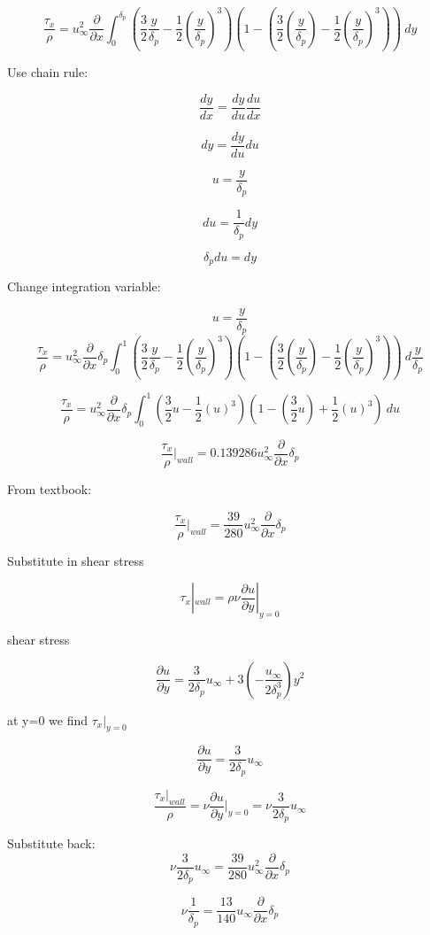 \documentclass[11pt]{article}
\begin{document}
$$ \frac{\tau_x}{\rho} =  u_\infty^2 \frac{\partial}{\partial x}   \int_0^{\delta_p} (\frac{3}{2} \frac{y}{\delta_p}  - \frac{1}{2} (\frac{y}{\delta_p} )^3)( 1 - (\frac{3}{2} (\frac{y}{\delta_p} )  - \frac{1}{2} (\frac{y}{\delta_p} )^3)) \ dy $$


Use chain rule:

$$\frac{dy}{dx} = \frac{dy}{du} \frac{du}{dx}$$

$$dy = \frac{dy}{du} du$$

$$u = \frac{y}{\delta_p}$$

$$du = \frac{1}{\delta_p} dy$$

$$\delta_p du = dy$$

Change integration variable:

$$u = \frac{y}{\delta_p}$$
$$ \frac{\tau_x}{\rho} =  u_\infty^2 \frac{\partial}{\partial x}  \delta_p \int_0^1 (\frac{3}{2} \frac{y}{\delta_p}  - \frac{1}{2} (\frac{y}{\delta_p} )^3)( 1 - (\frac{3}{2} (\frac{y}{\delta_p} )  - \frac{1}{2} (\frac{y}{\delta_p} )^3)) \ d\frac{y}{\delta_p} $$

$$ \frac{\tau_x}{\rho} =  u_\infty^2 \frac{\partial}{\partial x}  \delta_p \int_0^1 (\frac{3}{2} u  - \frac{1}{2} (u)^3)( 1 - (\frac{3}{2} u )  + \frac{1}{2} (u)^3) \ du $$

$$ \frac{\tau_x}{\rho}|_{wall} = 0.139286 u_\infty^2 \frac{\partial}{\partial x}  \delta_p  $$

From textbook:

$$ \frac{\tau_x}{\rho}|_{wall} = \frac{39}{280} u_\infty^2 \frac{\partial}{\partial x}  \delta_p  $$

Substitute in shear stress

$$\tau_x|_{wall} = \rho \nu \frac{\partial u}{\partial y}|_{y=0}$$

shear stress

$$\frac{\partial u}{\partial y} = \frac{3}{2 \delta_p} u_\infty + 3 (-\frac{u_\infty}{2 \delta_p^3}) y^2$$

at y=0 we find $\tau_x|_{y=0}$

$$\frac{\partial u}{\partial y} = \frac{3}{2 \delta_p} u_\infty $$

$$\frac{\tau_x |_{wall}}{\rho} = \nu \frac{\partial u}{\partial y}|_{y=0} = \nu \frac{3}{2 \delta_p} u_\infty $$

Substitute back:
$$ \nu \frac{3}{2 \delta_p} u_\infty  = \frac{39}{280} u_\infty^2 \frac{\partial}{\partial x}  \delta_p  $$

$$ \nu \frac{1}{ \delta_p}   = \frac{13}{140} u_\infty \frac{\partial}{\partial x}  \delta_p  $$
\end{document}
